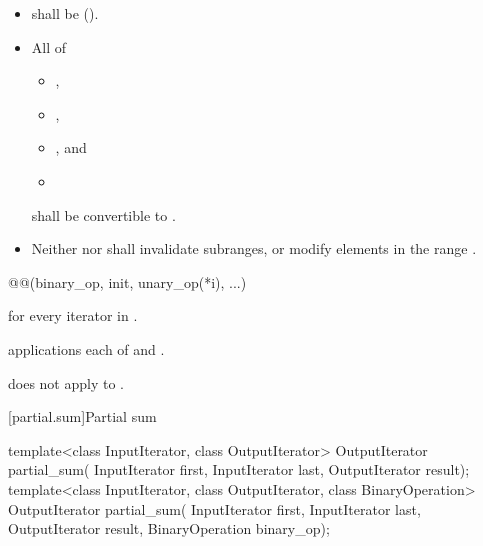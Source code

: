 \begin{itemdescr}
\pnum
\requires
\begin{itemize}
\item {} shall be  ().
\item All of
\begin{itemize}
\item {},
\item {},
\item {}, and
\item {}
\end{itemize}
shall be convertible to .
\item Neither  nor  shall invalidate subranges,
or modify elements in the range .
\end{itemize}

\pnum
\returns
\begin{codeblock}
@@(binary_op, init, unary_op(*i), ...)
\end{codeblock}
for every iterator  in .

\pnum
\complexity
{} applications each of  and
.

\pnum
\begin{note}
 does not apply  to .
\end{note}
\end{itemdescr}

[partial.sum]{Partial sum}

%
\begin{itemdecl}
template<class InputIterator, class OutputIterator>
  OutputIterator partial_sum(
    InputIterator first, InputIterator last,
    OutputIterator result);
template<class InputIterator, class OutputIterator, class BinaryOperation>
  OutputIterator partial_sum(
    InputIterator first, InputIterator last,
    OutputIterator result, BinaryOperation binary_op);
\end{itemdecl}

